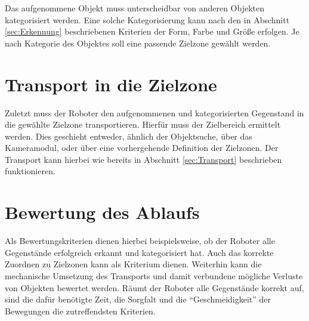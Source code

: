 Das aufgenommene Objekt muss unterscheidbar von anderen Objekten kategorisiert werden. Eine solche Kategorisierung kann nach den in Abschnitt \ref{sec:Erkennung} beschriebenen Kriterien der Form, Farbe und Größe erfolgen. Je nach Kategorie des Objektes soll eine passende Zielzone gewählt werden.

\section{Transport in die Zielzone}

Zuletzt muss der Roboter den aufgenommenen und kategorisierten Gegenstand in die gewählte Zielzone transportieren. Hierfür muss der Zielbereich ermittelt werden. Dies geschieht entweder, ähnlich der Objektsuche, über das Kameramodul, oder über eine vorhergehende Definition der Zielzonen. Der Transport kann hierbei wie bereits in Abschnitt \ref{sec:Transport} beschrieben funktionieren. 

\section{Bewertung des Ablaufs}
\label{sec:Bewertung}

Als Bewertungskriterien dienen hierbei beispielsweise, ob der Roboter alle Gegenstände erfolgreich erkannt und kategorisiert hat. Auch das korrekte Zuordnen zu Zielzonen kann als Kriterium dienen. Weiterhin kann die mechanische Umsetzung des Transports und damit verbundene mögliche Verluste von Objekten bewertet werden. Räumt der Roboter alle Gegenstände korrekt auf, sind die dafür benötigte Zeit, die Sorgfalt und die \enquote{Geschmeidigkeit} der Bewegungen die zutreffendsten Kriterien.